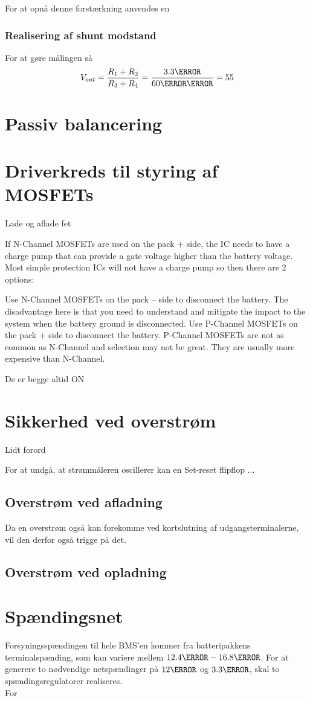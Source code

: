 For at opnå denne forstærkning anvendes en

\subsubsection{Realisering af shunt modstand}
For at gøre målingen så 
\begin {equation} 
V_{out} = \frac{R_{1}+R_{2}}{R_{3}+R_{4}} = \frac{3.3\volt}{60\milli\volt} = 55
\end {equation}
\section{Passiv balancering}

\section{Driverkreds til styring af MOSFETs}
Lade og aflade fet

If N-Channel MOSFETs are used on the pack + side, the IC needs to have a charge pump that can provide a gate voltage higher than the battery voltage.  Most simple protection ICs will not have a charge pump so then there are 2 options:

Use N-Channel MOSFETs on the pack – side to disconnect the battery.  The disadvantage here is that you need to understand and mitigate the impact to the system when the battery ground is disconnected.
Use P-Channel MOSFETs on the pack + side to disconnect the battery.  P-Channel MOSFETs are not as common as N-Channel and selection may not be great. They are usually more expensive than N-Channel.

De er begge altid ON

\section{Sikkerhed ved overstrøm}
Lidt forord

For at undgå, at strømmåleren oscillerer kan en Set-reset flipflop ...
\subsection{Overstrøm ved afladning}


Da en overstrøm også kan forekomme ved kortslutning af udgangsterminalerne, vil den derfor også trigge på det.

\subsection{Overstrøm ved opladning}

\section{Spændingsnet}
Forsyningsspændingen til hele BMS'en kommer fra batteripakkens terminalspænding, som kan variere mellem $12.4\volt - 16.8\volt$. For at generere to nødvendige netspændinger på $12\volt$ og $3.3\volt$, skal to spændingsregulatorer realiseres.
\\

For 

